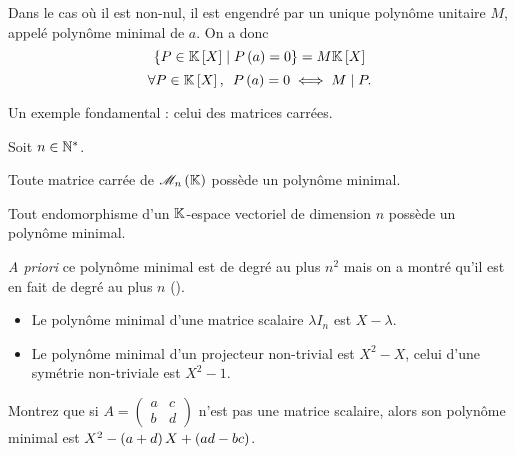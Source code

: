 Dans le cas où il est non-nul, il est engendré par un unique polynôme unitaire \(M\), appelé polynôme minimal de \(a\). On a donc \[\accol{P\in\poly\tq P\paren{a}=0}=M\poly\] \cad \[\quantifs{\forall P\in\poly}P\paren{a}=0\ssi M\divise P.\]

Un exemple fondamental : celui des matrices carrées.

\begin{theo}
Soit \(n\in\mathbb{N}^*\).

Toute matrice carrée de \(\M{n}\) possède un polynôme minimal.

Tout endomorphisme d'un \(\mathbb{K}\)-espace vectoriel de dimension \(n\) possède un polynôme minimal.
\end{theo}

\textit{A priori} ce polynôme minimal est de degré au plus \(n^2\) mais on a montré qu'il est en fait de degré au plus \(n\) (\cf {}).

\begin{ex}
\begin{itemize}
    \item Le polynôme minimal d'une matrice scalaire \(\lambda I_n\) est \(X-\lambda\). \\
    \item Le polynôme minimal d'un projecteur non-trivial est \(X^2-X\), celui d'une symétrie non-triviale est \(X^2-1\).
\end{itemize}
\end{ex}

\begin{exo}
Montrez que si \(A=\begin{pmatrix}
a & c \\
b & d
\end{pmatrix}\) n'est pas une matrice scalaire, alors son polynôme minimal est \(X^2-\left(a+d\right)X+\left(ad-bc\right)\).
\end{exo}
